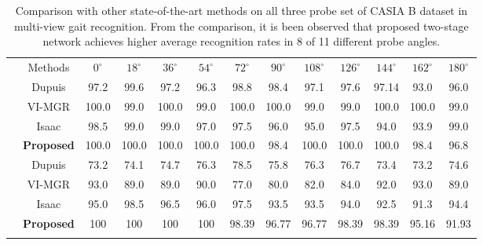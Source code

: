\begin{table}
	\centering
	\caption [Comparison with other state-of-the-art methods on all three probe set of CASIA B dataset in multi-view gait recognition]
	{Comparison with other state-of-the-art methods on all three probe set of CASIA B dataset in multi-view gait recognition. From the comparison, it is been observed that proposed two-stage network achieves higher average recognition rates in 8 of 11 different probe angles.\label{table:comp_multi_view}}
	\setlength{\tabcolsep}{3.5pt}
	\small
	{\begin{tabular*}{\textwidth}{|c|c|cccc cccc ccc|} \cline{1-13}\rule{0pt}{3ex}
		&Methods &${0^{\circ}}$ &${18^{\circ}}$  &${36^{\circ}}$ &${54^{\circ}}$ &${72^{\circ}}$	&${90^{\circ}}$	&${108^{\circ}}$ &${126^{\circ}}$ &${144^{\circ}}$ &${162^{\circ}}$  &${180^{\circ}}$ \\\cline{1-13}\rule{0pt}{3ex}
					
		\multirow{4}{*}{\rotatebox{90}{Normal}} &Dupuis &97.2 &99.6 &97.2 &96.3 &98.8 &98.4 &97.1 &97.6 &97.14 &93.0 &96.0 \\\rule{0pt}{3ex}
		
		&VI-MGR &100.0 &99.0 &100.0 &99.0 &100.0 &100.0 &99.0 &99.0 &100.0 &100.0 &99.0 \\ \rule{0pt}{3ex}
		
		&Isaac &98.5 &99.0 &99.0 &97.0 &97.5 &96.0 &95.0 &97.5 &94.0 &93.9 &99.0 \\\rule{0pt}{3ex}
		
		&\textbf{Proposed} &100.0  &100.0  &100.0  &100.0  &100.0  &98.4  &100.0  &100.0  &100.0  &98.4  &96.8 \\\cline{1-13}\rule{0pt}{3ex}
	
	
	
		\multirow{4}{*}{\rotatebox{90}{Bag}} &Dupuis &73.2 &74.1 &74.7 &76.3 &78.5 &75.8 &76.3 &76.7 &73.4 &73.2 &74.6 \\\rule{0pt}{3ex} 

		&VI-MGR &93.0 &89.0 &89.0 &90.0 &77.0 &80.0 &82.0 &84.0 &92.0 &93.0 &89.0 \\\rule{0pt}{3ex}

		&Isaac &95.0 &98.5 &96.5 &96.0 &97.5 &93.5 &93.5 &94.0 &92.5 &91.3 &94.4 \\\rule{0pt}{3ex}

		&\textbf{Proposed}  &100 &100 &100 &100 &98.39 &96.77 &96.77 &98.39 &98.39 &95.16 &91.93 \\\hline\rule{0pt}{3ex}



\end{tabular*}}
\end{table}
